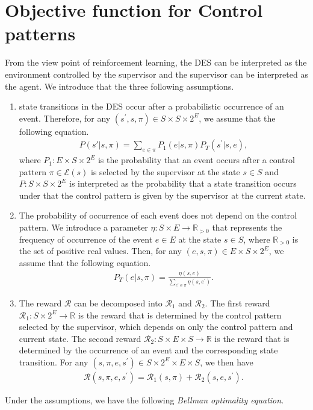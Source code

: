 \documentclass[letterpaper, 10 pt, conference]{ieeeconf}
\begin{document}
\section{Objective function for Control patterns}
From the view point of reinforcement learning, the DES can be interpreted as the environment controlled by the supervisor and the supervisor can be interpreted as the agent. We introduce that the three following assumptions.

\begin{enumerate}
  \item state transitions in the DES occur after a probabilistic occurrence of an event. Therefore, for any $(s^{\prime}, s, \pi) \in S \times S \times 2^E$, we assume that the following equation.
  \begin{align}
    P(s'|s,\pi) = \sum_{e \in \pi}P_1(e|s,\pi) P_T(s^{\prime}|s,e),
  \end{align}
  where $P_1 : E \times S \times 2^E$ is the probability that an event occurs after a control pattern $\pi \in \mathcal{E}(s)$ is selected by the supervisor at the state $s \in S$ and $P : S \times S \times 2^E$ is interpreted as the probability that a state transition occurs under that the control pattern is given by the supervisor at the current state.

  \item The probability of occurrence of each event does not depend on the control pattern. We introduce a parameter $\eta : S \times E \rightarrow \mathbb{R}_{>0}$ that represents the frequency of occurrence of the event $e \in E$ at the state $s \in S$, where $\mathbb{R}_{>0}$ is the set of positive real values. Then, for any $(e,s,\pi) \in E \times S \times 2^E$, we assume that the following equation.
  \begin{align}
    P_T(e|s,\pi) = \frac{\eta(s,e)}{\sum_{e^{\prime} \in \pi} \eta(s,e^{\prime})}.
  \end{align}

  \item The reward $\mathcal{R}$ can be decomposed into $\mathcal{R}_1$ and $\mathcal{R}_2$. The first reward $\mathcal{R}_1 : S \times 2^E \rightarrow \mathbb{R}$ is the reward that is determined by the control pattern selected by the supervisor, which depends on only the control pattern and current state. The second reward $\mathcal{R}_2 : S \times E \times S \rightarrow \mathbb{R}$ is the reward that is determined by the occurrence of an event and the corresponding state transition. For any $(s,\pi,e,s^{\prime}) \in S \times 2^E \times E \times S$, we then have
  \begin{align}
    \mathcal{R}(s,\pi,e,s^{\prime}) = \mathcal{R}_1(s,\pi) + \mathcal{R}_2(s,e,s^{\prime}).
  \end{align}
\end{enumerate}
Under the assumptions, we have the following {\it Bellman optimality equation}.
\end{document}
